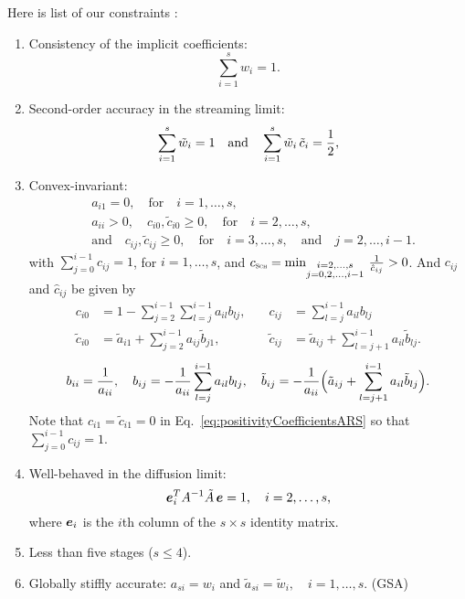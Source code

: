 Here is list of our constraints \cite{chu_etal_2018}:
\begin{enumerate}
    \item Consistency of the implicit coefficients:
    \begin{equation}
      \sum_{i=1}^{s}w_{i}=1.
    \end{equation}
    \item Second-order accuracy in the streaming limit:
    \begin{equation}
      \sum_{i=1}^{s}\tilde{w}_{i}=1
      \quad\text{and}\quad
      \sum_{i=1}^{s}\tilde{w}_{i}\,\tilde{c}_{i}=\frac{1}{2},
      \label{eq:orderConditionsEx}
    \end{equation}
    \item Convex-invariant:
    \begin{align}
      &a_{i1} = 0, \quad \text{for} \quad i=1,\ldots,s, \nonumber \\
      &a_{ii}>0, \quad c_{i0},\tilde{c}_{i0}\ge0, \quad \text{for} \quad i=2,\ldots,s, \nonumber \\
      &\text{and} \quad c_{ij},\tilde{c}_{ij}\ge0, \quad \text{for} \quad i=3,\ldots,s, \quad\text{and}\quad j=2,\ldots,i-1.  
    \end{align}
    with $\sum_{j=0}^{i-1}c_{ij}=1$, for $i=1,\ldots,s$, and $c_{\textnormal{\tiny\textsc{Sch}}}=\min_{\substack{i = 2,\ldots,s \\ 
                  j = 0,2,\ldots,i-1}}\,\frac{1}{\hat{c}_{ij}}>0$.
    And $c_{ij}$ and $\hat{c}_{ij}$ be given by
    \begin{equation}
     \begin{aligned}
      c_{i0} &= 1-\sum_{j=2}^{i-1}\sum_{l=j}^{i-1}a_{il}b_{lj}, \quad &
      c_{ij} &= \sum_{l=j}^{i-1}a_{il}b_{lj} \\
      \tilde{c}_{i0} &= \tilde{a}_{i1}+\sum_{j=2}^{i-1}a_{ij}\tilde{b}_{j1}, \quad &
      \tilde{c}_{ij} &= \tilde{a}_{ij}+\sum_{l=j+1}^{i-1}a_{il}\tilde{b}_{lj}.  
     \end{aligned}
     \label{eq:positivityCoefficientsARS}
    \end{equation}
    \begin{equation}
      b_{ii} = \frac{1}{a_{ii}}, \quad
      b_{ij} = -\frac{1}{a_{ii}}\sum_{l=j}^{i-1}a_{il}b_{lj}, \quad
      \tilde{b}_{ij} = -\frac{1}{a_{ii}}\Big(\tilde{a}_{ij}+\sum_{l=j+1}^{i-1}a_{il}\tilde{b}_{lj}\Big).  
    \end{equation}
    Note that $c_{i1}=\tilde{c}_{i1}=0$ in Eq.~\eqref{eq:positivityCoefficientsARS} so that $\sum_{j=0}^{i-1}c_{ij}=1$.
    \item Well-behaved in the diffusion limit:
    \begin{equation}
      \boldsymbol{e}_{i}^{T}A^{-1}\tilde{A}\,\boldsymbol{e} = 1, \quad i=2,\ldots,s,
      \label{eq:diffusionCondition}
    \end{equation}
    where $\boldsymbol{e}_{i}$ is the $i$th column of the $s\times s$ identity matrix.
    \item Less than five stages ($s\le4$).
    \item Globally stiffly accurate: $a_{si}=w_{i}$ and $\tilde{a}_{si}=\tilde{w}_{i},\quad i=1,\ldots,s$. (GSA)
\end{enumerate}  

